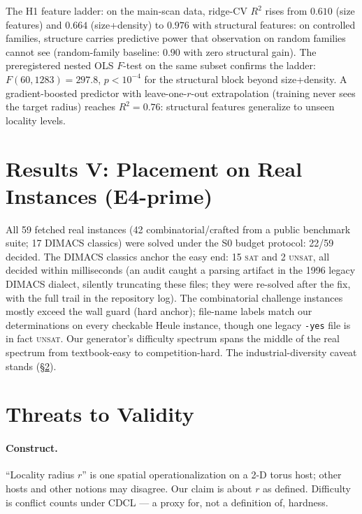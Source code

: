 \documentclass[11pt]{article}
\begin{document}
The H1 feature ladder: on the main-scan data, ridge-CV $R^2$ rises from
$0.610$ (size features) and $0.664$ (size+density) to $\mathbf{0.976}$ with
structural features: on controlled families, structure carries predictive
power that observation on random families cannot see (random-family baseline:
$0.90$ with zero structural gain). The preregistered nested OLS
$F$-test on the same subset confirms the ladder: $F(60,1283)=297.8$,
$p<10^{-4}$ for the structural block beyond size+density. A
gradient-boosted predictor with leave-one-$r$-out extrapolation (training
never sees the target radius) reaches $R^2 = 0.76$: structural features
generalize to unseen locality levels.

\section{Results V: Placement on Real Instances (E4-prime)}
\label{sec:e4}

All 59 fetched real instances (42 combinatorial/crafted from a public
benchmark suite; 17 DIMACS classics) were solved under the S0 budget protocol:
22/59 decided. The DIMACS classics anchor the easy end: 15 \textsc{sat} and 2
\textsc{unsat}, all decided within milliseconds (an audit caught a parsing
artifact in the 1996 legacy DIMACS dialect, silently truncating these files;
they were re-solved after the fix, with the full trail in the repository log).
The combinatorial challenge instances mostly exceed the wall guard (hard
anchor); file-name labels match our determinations on every checkable Heule
instance, though one legacy \texttt{-yes} file is in fact \textsc{unsat}. Our
generator's difficulty spectrum spans the middle of the real spectrum from
textbook-easy to competition-hard. The industrial-diversity caveat stands
(\S\ref{sec:threats}).

\section{Threats to Validity}
\label{sec:threats}

\paragraph{Construct.}
``Locality radius $r$'' is one spatial operationalization on a 2-D torus host;
other hosts and other notions may disagree. Our claim is about $r$ as defined.
Difficulty is conflict counts under CDCL --- a proxy for, not a definition of,
hardness.
\end{document}
